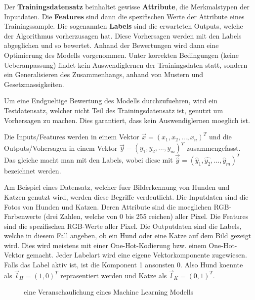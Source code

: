 \documentclass[../main]{subfiles}
\begin{document}
Der \textbf{Trainingsdatensatz} beinhaltet gewisse \textbf{Attribute}, die Merkmalstypen der Inputdaten.
Die \textbf{Features} sind dann die spezifischen Werte der Attribute eines Trainingssample.
Die sogenannten \textbf{Labels} sind die erwarteten Outputs, welche der Algorithmus vorherzusagen hat.
Diese Vorhersagen werden mit den Labels abgeglichen und so bewertet.
Anhand der Bewertungen wird dann eine Optimierung des Modells vorgenommen.
Unter korrekten Bedingungen (keine Ueberanpassung) findet kein Auswendiglernen der Trainingsdaten statt,
sondern ein Generalisieren des Zusammenhangs, anhand von Mustern und Gesetzmassigkeiten.
\par\medskip
Um eine Endgueltige Bewertung des Modells durchzufuehren, wird ein Testdatensatz, welcher nicht Teil des Trainingsdatensatz ist, genutzt um Vorhersagen zu machen.
Dies garantiert, dass kein Auswendiglernen moeglich ist.
\par\medskip
Die Inputs/Features werden in einem Vektor $\vec{x}=(x_1,x_2,...,x_n)^T$ und die Outputs/Vohersagen in einem Vektor $\vec{y}=(y_1,y_2,...,y_m)^T$ zusammengefasst.
Das gleiche macht man mit den Labels, wobei diese mit $\vec{\hat{y}}=(\hat{y}_1,\hat{y_2},...,\hat{y}_m)^T$ bezeichnet werden.
\par \medskip
Am Beispiel eines Datensatz, welcher fuer Bilderkennung von Hunden und Katzen genutzt wird, werden diese Begriffe verdeutlicht.
Die Inputdaten sind die Fotos von Hunden und Katzen. Deren Attribute sind die moeglichen RGB-Farbenwerte (drei Zahlen, welche von 0 bis 255 reichen) aller Pixel.
Die Features sind die spezifischen RGB-Werte aller Pixel. Die Outputdaten sind die Labels, welche in diesem Fall angeben, ob ein Hund oder eine Katze auf dem Bild gezeigt wird.
Dies wird meistens mit einer One-Hot-Kodierung bzw. einem One-Hot-Vektor gemacht. Jeder Labelart wird eine eigene Vektorkomponente zugewiesen. Falls das Label aktiv ist, ist die Komponent 1 ansonsten 0. Also Hund koennte als $\vec{l}_H=(1,0)^T$ reprasentiert werden und Katze als $\vec{l}_K=(0,1)^T$.

\begin{figure}[h!]
    \centering
    \begin{tikzpicture}[node distance=5cm,auto]
        
    \end{tikzpicture}
    
    \caption{eine Veranschaulichung eines Machine Learning Modells}
\end{figure}
\end{document}
